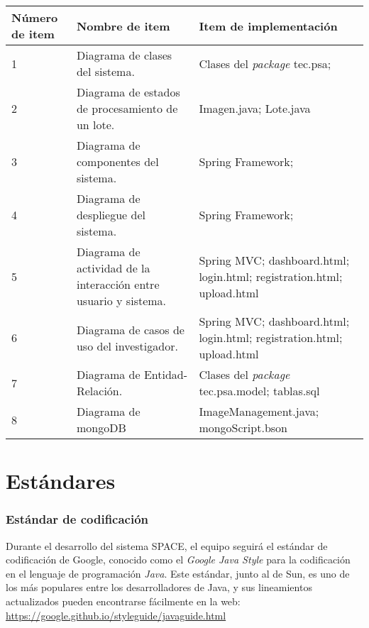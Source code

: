 \documentclass{scrreprt}
\begin{document}
\begin{center}
    \begin{tabular}{|p{1.5cm}|p{5.0cm}|p{7.5cm}|}
        \hline
	    Número de item & Nombre de item & Item de implementación \\
        \hline
	    1 & Diagrama de clases del sistema.  & Clases del \textit{package} tec.psa;  \\
        \hline        
        2 & Diagrama de estados de procesamiento de un lote.  & Imagen.java; Lote.java  \\
        \hline
        3 & Diagrama de componentes del sistema. & Spring Framework;  \\
        \hline
        4 & Diagrama de despliegue del sistema. & Spring Framework; \\
        \hline
        5 & Diagrama de actividad de la interacción entre usuario y sistema. & Spring MVC;  dashboard.html; login.html; registration.html; upload.html\\
        \hline
        6 & Diagrama de casos de uso del investigador. &Spring MVC;  dashboard.html; login.html; registration.html; upload.html\\
        \hline
        7 & Diagrama de Entidad-Relación. &  Clases del \textit{package} tec.psa.model; tablas.sql \\
        \hline
        8 & Diagrama de mongoDB & ImageManagement.java; mongoScript.bson \\
        \hline
        
    \end{tabular}
\end{center}

\chapter{Estándares}

\subsection{Estándar de codificación}

Durante el desarrollo del sistema SPACE, el equipo seguirá el estándar de codificación de Google, conocido como el \textit{Google Java Style} para la codificación en el lenguaje de programación \textit{Java}. Este estándar, junto al de Sun, es uno de los más populares entre los desarrolladores de Java, y sus lineamientos actualizados pueden encontrarse fácilmente en la web: \href{https://google.github.io/styleguide/javaguide.html}{https://google.github.io/styleguide/javaguide.html}\\
\end{document}
